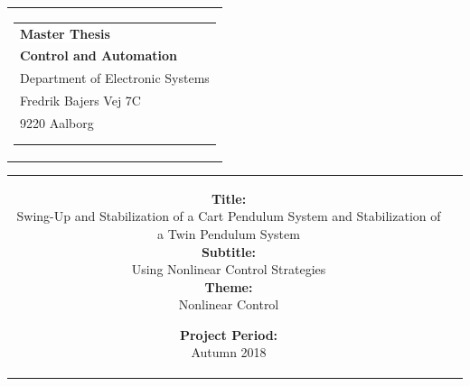 % 
\begin{nopagebreak}
{\samepage 

\begin{tabular}{r}
\parbox{\textwidth}{  \vspace{-1cm}
\hfill \hspace{2cm} \parbox{8cm}{\begin{tabular}{l} %
{\small \textbf{\textcolor{aaublue}{\colorbox{white}{Master Thesis}}}}\\
{\small \textbf{\textcolor{aaublue}{Control and Automation}}}\\ 
{\small \textcolor{aaublue}{Department of Electronic Systems}}\\
{\small \textcolor{aaublue}{Fredrik Bajers Vej 7C}}\\
{\small \textcolor{aaublue}{9220 Aalborg}} \vspace{1.2cm}\\
 \\
\vspace{-2.5cm}
\end{tabular}}}
\end{tabular}

\begin{tabular}{cc}
\parbox{7cm}{

\textbf{Title:} \\
Swing-Up and Stabilization of a Cart Pendulum System and  Stabilization of a Twin Pendulum System \\

\textbf{Subtitle:} \\
Using Nonlinear Control Strategies \\

\textbf{Theme:} \\
\small{Nonlinear Control
\\
}

\parbox{8cm}{

\textbf{Project Period:}\\
Autumn 2018\\
   
}}
\end{tabular}}
\end{nopagebreak}
